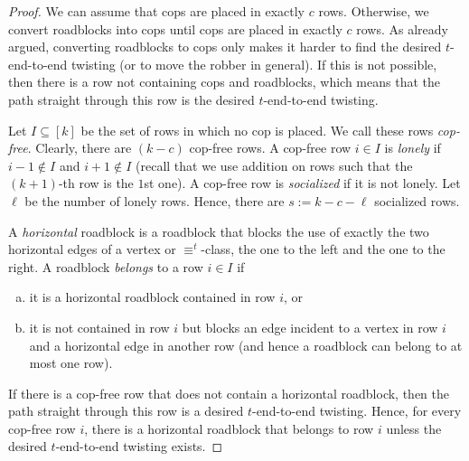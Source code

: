 \documentclass[10pt,a4paper]{article}
\newcommand{\defining}[1]{\emph{#1}}
\newcommand{\comp}{\equiv}
\begin{document}
\begin{proof}
	
	We can assume that cops are placed in exactly $c$ rows.
	Otherwise, we convert roadblocks into cops
	until cops are placed in exactly $c$ rows.
	As already argued, converting roadblocks to cops only
	makes it harder to find the desired $t$-end-to-end twisting
	(or to move the robber in general).
	If this is not possible, then there is a row not containing cops
	and roadblocks, which means that the path straight through
	this row is the desired $t$-end-to-end twisting.
	
	Let $I\subseteq [k]$ be the set of rows in which no cop is placed.
	We call these rows \defining{cop-free}.
	Clearly, there are $(k - c)$ cop-free rows.
	A cop-free row $i \in I$ is \defining{lonely}
	if $i-1 \notin I$ and $i+1 \notin I$
	(recall that we use addition on rows such that
	the $(k+1)$-th row is the $1$st one).
	A cop-free row is \defining{socialized} if it is not lonely.
	Let $\ell$ be the number of lonely rows.
	Hence, there are $s := k - c - \ell$ socialized rows.
	
	
	A \defining{horizontal} roadblock is a roadblock
	that blocks the use of exactly the two horizontal edges of a vertex or $\comp^t$-class, the one to the left and the one to the right.
	A roadblock \defining{belongs} to a row $i \in I$
	if 
	\begin{enumerate}[(a)]
		\item it is a horizontal roadblock contained in row $i$, or
		\item it is not contained in row $i$
		but blocks an edge incident to a vertex in row $i$
		and a horizontal edge in another row
		(and hence a roadblock can belong to at most one row).
	\end{enumerate}
	
	\noindent If there is a cop-free row
	that does not contain a horizontal roadblock,
	then the path straight through this row
	is a desired $t$-end-to-end twisting. 
	Hence, for every cop-free row $i$, 
	there is a horizontal roadblock that belongs to row $i$
	unless the desired $t$-end-to-end twisting exists.
	

\end{proof}
\end{document}
